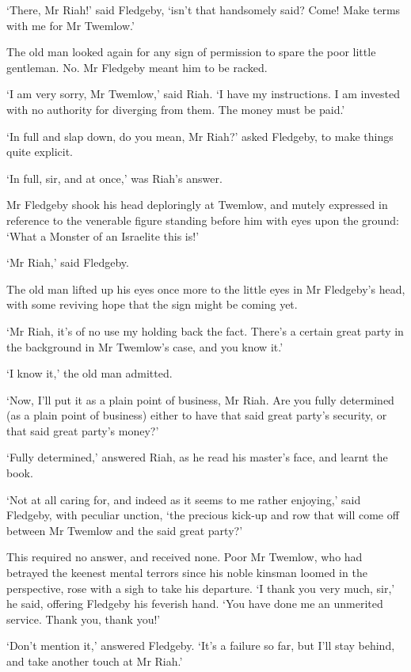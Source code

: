‘There, Mr Riah!’ said Fledgeby, ‘isn’t that handsomely said? Come! Make
terms with me for Mr Twemlow.’

The old man looked again for any sign of permission to spare the poor
little gentleman. No. Mr Fledgeby meant him to be racked.

‘I am very sorry, Mr Twemlow,’ said Riah. ‘I have my instructions. I am
invested with no authority for diverging from them. The money must be
paid.’

‘In full and slap down, do you mean, Mr Riah?’ asked Fledgeby, to make
things quite explicit.

‘In full, sir, and at once,’ was Riah’s answer.

Mr Fledgeby shook his head deploringly at Twemlow, and mutely expressed
in reference to the venerable figure standing before him with eyes upon
the ground: ‘What a Monster of an Israelite this is!’

‘Mr Riah,’ said Fledgeby.

The old man lifted up his eyes once more to the little eyes in Mr
Fledgeby’s head, with some reviving hope that the sign might be coming
yet.

‘Mr Riah, it’s of no use my holding back the fact. There’s a certain
great party in the background in Mr Twemlow’s case, and you know it.’

‘I know it,’ the old man admitted.

‘Now, I’ll put it as a plain point of business, Mr Riah. Are you fully
determined (as a plain point of business) either to have that said great
party’s security, or that said great party’s money?’

‘Fully determined,’ answered Riah, as he read his master’s face, and
learnt the book.

‘Not at all caring for, and indeed as it seems to me rather enjoying,’
said Fledgeby, with peculiar unction, ‘the precious kick-up and row that
will come off between Mr Twemlow and the said great party?’

This required no answer, and received none. Poor Mr Twemlow, who had
betrayed the keenest mental terrors since his noble kinsman loomed in
the perspective, rose with a sigh to take his departure. ‘I thank you
very much, sir,’ he said, offering Fledgeby his feverish hand. ‘You have
done me an unmerited service. Thank you, thank you!’

‘Don’t mention it,’ answered Fledgeby. ‘It’s a failure so far, but I’ll
stay behind, and take another touch at Mr Riah.’

